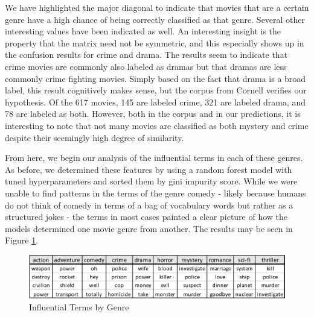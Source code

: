 \documentclass{article} %
\begin{document}
We have highlighted the major diagonal to indicate that movies that are a certain genre have a high chance of being correctly classified as that genre. Several other interesting values have been indicated as well. An interesting insight is the property that the matrix need not be symmetric, and this especially shows up in the confusion results for crime and drama. The results seem to indicate that crime movies are commonly also labeled as dramas but that dramas are less commonly crime fighting movies. Simply based on the fact that drama is a broad label, this result cognitively makes sense, but the corpus from Cornell verifies our hypothesis. Of the 617 movies, 145 are labeled crime, 321 are labeled drama, and 78 are labeled as both. However, both in the corpus and in our predictions, it is interesting to note that not many movies are classified as both mystery and crime despite their seemingly high degree of similarity.

From here, we begin our analysis of the influential terms in each of these genres. As before, we determined these features by using a random forest model with tuned hyperparameters and sorted them by gini impurity score. While we were unable to find patterns in the terms of the genre comedy - likely because humans do not think of comedy in terms of a bag of vocabulary words but rather as a structured jokes - the terms in most cases painted a clear picture of how the models determined one movie genre from another. The results may be seen in Figure \ref{term_data}.

\begin{figure}[htb]
\centering
\includegraphics[width=1\linewidth]{terms}
\caption{Influential Terms by Genre}
\label{term_data}
\end{figure}
\end{document}
